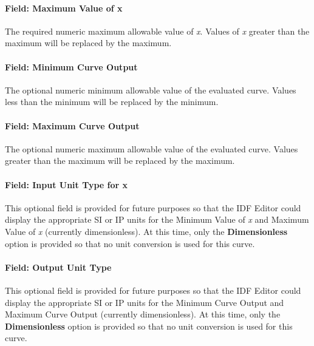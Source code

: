 \paragraph{Field: Maximum Value of x}\label{field-maximum-value-of-x-15}

The required numeric maximum allowable value of \emph{x}. Values of \emph{x} greater than the maximum will be replaced by the maximum.

\paragraph{Field: Minimum Curve Output}\label{field-minimum-curve-output-14}

The optional numeric minimum allowable value of the evaluated curve. Values less than the minimum will be replaced by the minimum.

\paragraph{Field: Maximum Curve Output}\label{field-maximum-curve-output-13}

The optional numeric maximum allowable value of the evaluated curve. Values greater than the maximum will be replaced by the maximum.

\paragraph{Field: Input Unit Type for x}\label{field-input-unit-type-for-x-14}

This optional field is provided for future purposes so that the IDF Editor could display the appropriate SI or IP units for the Minimum Value of \emph{x} and Maximum Value of \emph{x} (currently dimensionless). At this time, only the \textbf{Dimensionless} option is provided so that no unit conversion is used for this curve.

\paragraph{Field: Output Unit Type}\label{field-output-unit-type-13}

This optional field is provided for future purposes so that the IDF Editor could display the appropriate SI or IP units for the Minimum Curve Output and Maximum Curve Output (currently dimensionless). At this time, only the \textbf{Dimensionless} option is provided so that no unit conversion is used for this curve.

